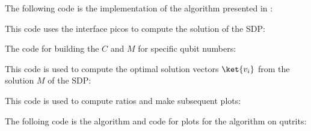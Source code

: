 The following code is the implementation of the algorithm presented in \cite{bravyi19}:

\bigskip
This code uses the interface picos to compute the solution of the SDP:

\bigskip
The code for building the $C$ and $M$ for specific qubit numbers:

\bigskip
This code is used to compute the optimal solution vectors $\ket{v_i}$ from the solution $M$ of the SDP:

\bigskip
This code is used to compute ratios and make subsequent plots:

\bigskip
The folloing code is the algorithm and code for plots for the algorithm on qutrits:

